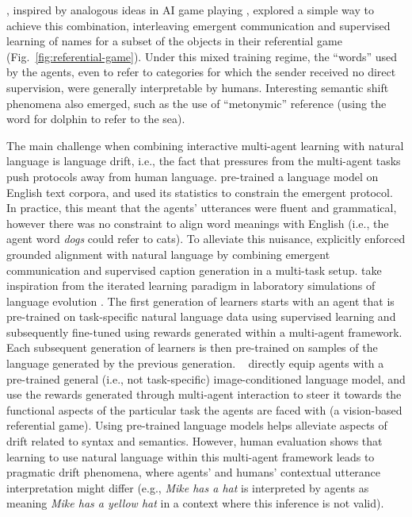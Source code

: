 , inspired by analogous ideas in AI game
playing \cite{Silver:etal:2016}, explored a simple way to achieve this
combination, interleaving emergent communication and supervised
learning of names for a subset of the objects in their referential game (Fig.~\ref{fig:referential-game}). Under this mixed training
regime, the ``words'' used by the agents, even to refer to categories
for which the sender received no direct supervision, were generally
interpretable by humans. Interesting semantic shift phenomena also
emerged, such as the use of ``metonymic'' reference (using the word
for dolphin to refer to the sea). 

The main challenge when combining interactive multi-agent learning with natural language is language drift, i.e., the fact that pressures from the multi-agent tasks push protocols away from human language. 
  pre-trained a language model on English text corpora, and used its
statistics to constrain the emergent protocol. In practice, this meant
that the agents' utterances were fluent and grammatical, however there
was no constraint to align word meanings with English (i.e., the agent
word \emph{dogs} could refer to cats). 
To alleviate this nuisance,  explicitly enforced grounded alignment with natural
language by combining emergent communication and supervised
caption generation in a multi-task setup.   take inspiration from the iterated learning paradigm in laboratory simulations of language evolution \cite{Kirby:Hurford:2002}. The first generation of learners starts with an agent that is pre-trained on task-specific natural language data using supervised learning and subsequently fine-tuned using rewards generated within a multi-agent framework. Each subsequent generation of learners is then pre-trained on samples of the language generated by the previous generation. %
~ directly equip agents with a pre-trained general (i.e., not task-specific) image-conditioned language model, and use the rewards generated through multi-agent interaction to steer it towards the functional aspects of the particular task the agents are faced with (a vision-based referential game). Using pre-trained language models helps alleviate aspects of drift related to syntax and semantics. However, human evaluation shows that learning to use natural language within this multi-agent framework leads to pragmatic drift phenomena, where agents' and humans' contextual utterance interpretation might differ (e.g.,  \textit{Mike has a hat} is interpreted by agents as meaning \textit{Mike has a yellow hat} in a context where this inference is not valid). 

